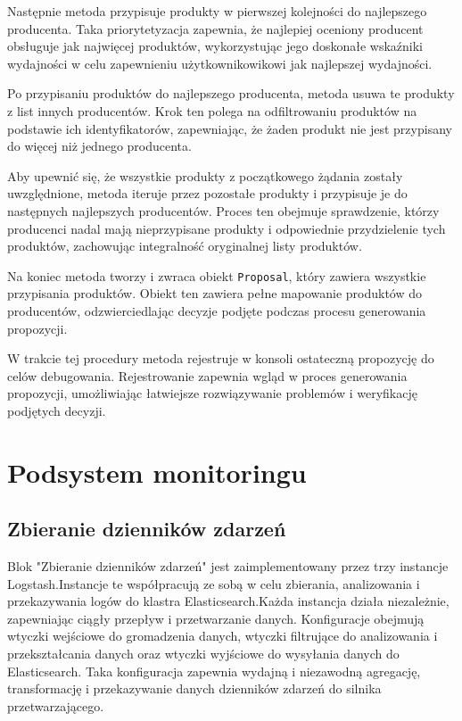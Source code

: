 \begin{itemize}
    Następnie metoda przypisuje produkty w pierwszej kolejności do najlepszego producenta. Taka priorytetyzacja zapewnia, że najlepiej oceniony producent obsługuje jak najwięcej produktów, wykorzystując jego doskonałe wskaźniki wydajności w celu zapewnieniu użytkownikowikowi jak najlepszej wydajności.

    Po przypisaniu produktów do najlepszego producenta, metoda usuwa te produkty z list innych producentów. Krok ten polega na odfiltrowaniu produktów na podstawie ich identyfikatorów, zapewniając, że żaden produkt nie jest przypisany do więcej niż jednego producenta.

    Aby upewnić się, że wszystkie produkty z początkowego żądania zostały uwzględnione, metoda iteruje przez pozostałe produkty i przypisuje je do następnych najlepszych producentów. Proces ten obejmuje sprawdzenie, którzy producenci nadal mają nieprzypisane produkty i odpowiednie przydzielenie tych produktów, zachowując integralność oryginalnej listy produktów.
    
    Na koniec metoda tworzy i zwraca obiekt \verb|Proposal|, który zawiera wszystkie przypisania produktów. Obiekt ten zawiera pełne mapowanie produktów do producentów, odzwierciedlając decyzje podjęte podczas procesu generowania propozycji.

    W trakcie tej procedury metoda rejestruje w konsoli ostateczną propozycję do celów debugowania. Rejestrowanie zapewnia wgląd w proces generowania propozycji, umożliwiając łatwiejsze rozwiązywanie problemów i weryfikację podjętych decyzji.
\end{itemize}

\section{Podsystem monitoringu}

\subsection{Zbieranie dzienników zdarzeń}

Blok "Zbieranie dzienników zdarzeń" jest zaimplementowany przez trzy instancje Logstash.Instancje te współpracują ze sobą w celu zbierania, analizowania i przekazywania logów do klastra Elasticsearch.Każda instancja działa niezależnie, zapewniając ciągły przepływ i przetwarzanie danych. Konfiguracje obejmują wtyczki wejściowe do gromadzenia danych, wtyczki filtrujące do analizowania i przekształcania danych oraz wtyczki wyjściowe do wysyłania danych do Elasticsearch. Taka konfiguracja zapewnia wydajną i niezawodną agregację, transformację i przekazywanie danych dzienników zdarzeń do silnika przetwarzającego.

